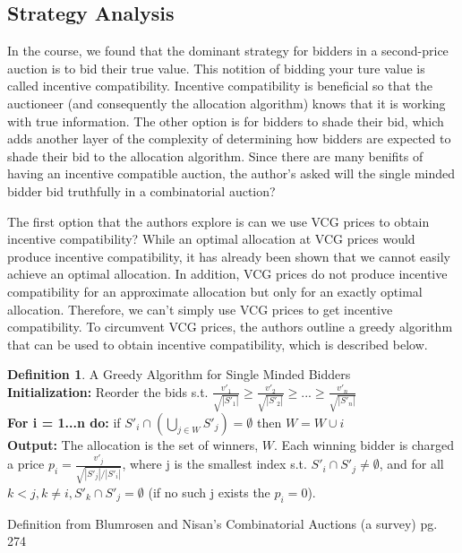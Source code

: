 \documentclass[10pt,onecolumn,letterpaper]{article}
\theoremstyle{definition}
\newtheorem{definition}{Definition}[section]
\begin{document}
\subsection{Strategy Analysis} %

In the course, we found that the dominant strategy for bidders in a second-price auction is to bid their true value. This notition of bidding your ture value is called incentive compatibility. Incentive compatibility is beneficial so that the auctioneer (and consequently the allocation algorithm) knows that it is working with true information. The other option is for bidders to shade their bid, which adds another layer of the complexity of determining how bidders are expected to shade their bid to the allocation algorithm. Since there are many benifits of having an incentive compatible auction, the author's asked will the single minded bidder bid truthfully in a combinatorial auction?

The first option that the authors explore is can we use VCG prices to obtain incentive compatibility? While an optimal allocation at VCG prices would produce incentive compatibility, it has already been shown that we cannot easily achieve an optimal allocation. In addition, VCG prices do not produce incentive compatibility for an approximate allocation but only for an exactly optimal allocation. Therefore, we can't simply use VCG prices to get incentive compatibility. To circumvent VCG prices, the authors outline a greedy algorithm that can be used to obtain incentive compatibility, which is described below.

\theoremstyle{definition}
\begin{definition}{A Greedy Algorithm for Single Minded Bidders}
\\
\textbf{Initialization:} Reorder the bids s.t. $\frac{v'_1}{\sqrt{|S'_1|}} \geq \frac{v'_2}{\sqrt{|S'_2|}} \geq ... \geq \frac{v'_n}{\sqrt{|S'_n|}} $
\\
\textbf{For i = 1...n do:} if $S'_i \cap (\bigcup_{j \in W} S'_j) = \emptyset$ then $W = W \cup i$
\\
\textbf{Output:} The allocation is the set of winners, $W$. Each winning bidder is charged a price $p_i = \frac{v'_j}{\sqrt{|S'_j|/|S'_i|}}$, where j is the smallest index s.t. $S'_i \cap S'_j \neq \emptyset$, and for all $k < j, k \neq i, S'_k \cap S'_j = \emptyset$ (if no such j exists the $p_i = 0$).

Definition from Blumrosen and Nisan's Combinatorial Auctions (a survey) pg. 274 \cite{paper}
\end{definition}
\end{document}
